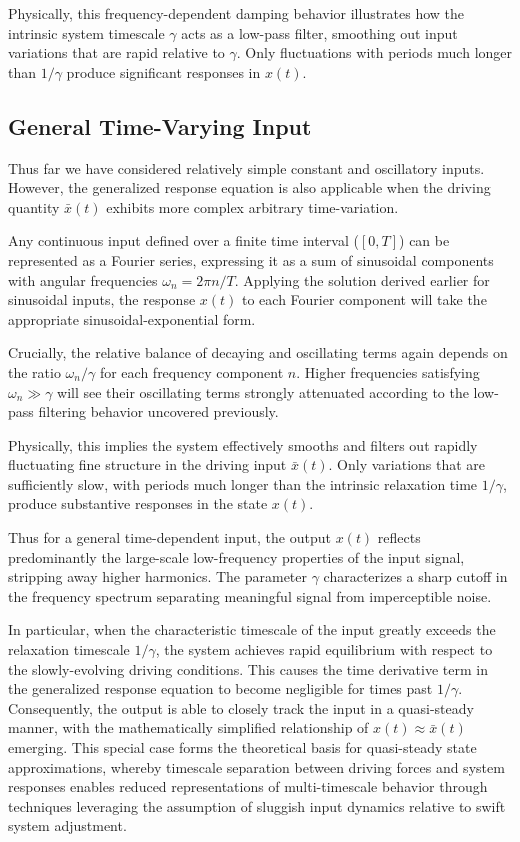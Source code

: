 Physically, this frequency-dependent damping behavior illustrates how the intrinsic system timescale $\gamma$ acts as a low-pass filter, smoothing out input variations that are rapid relative to $\gamma$. Only fluctuations with periods much longer than $1/\gamma$ produce significant responses in $x(t)$.

\subsection{General Time-Varying Input}

Thus far we have considered relatively simple constant and oscillatory inputs. However, the generalized response equation is also applicable when the driving quantity $\bar{x}(t)$ exhibits more complex arbitrary time-variation.

Any continuous input defined over a finite time interval ($[0, T]$) can be represented as a Fourier series, expressing it as a sum of sinusoidal components with angular frequencies $\omega_n = 2\pi n/T$. Applying the solution derived earlier for sinusoidal inputs, the response $x(t)$ to each Fourier component will take the appropriate sinusoidal-exponential form.

Crucially, the relative balance of decaying and oscillating terms again depends on the ratio $\omega_n/\gamma$ for each frequency component $n$. Higher frequencies satisfying $\omega_n \gg \gamma$ will see their oscillating terms strongly attenuated according to the low-pass filtering behavior uncovered previously.

Physically, this implies the system effectively smooths and filters out rapidly fluctuating fine structure in the driving input $\bar{x}(t)$. Only variations that are sufficiently slow, with periods much longer than the intrinsic relaxation time $1/\gamma$, produce substantive responses in the state $x(t)$.

Thus for a general time-dependent input, the output $x(t)$ reflects predominantly the large-scale low-frequency properties of the input signal, stripping away higher harmonics. The parameter $\gamma$ characterizes a sharp cutoff in the frequency spectrum separating meaningful signal from imperceptible noise. 

In particular, when the characteristic timescale of the input greatly exceeds the relaxation timescale $1/\gamma$, the system achieves rapid equilibrium with respect to the slowly-evolving driving conditions. This causes the time derivative term in the generalized response equation to become negligible for times past $1/\gamma$. Consequently, the output is able to closely track the input in a quasi-steady manner, with the mathematically simplified relationship of $x(t) \approx \bar{x}(t)$ emerging. This special case forms the theoretical basis for quasi-steady state approximations, whereby timescale separation between driving forces and system responses enables reduced representations of multi-timescale behavior through techniques leveraging the assumption of sluggish input dynamics relative to swift system adjustment.

